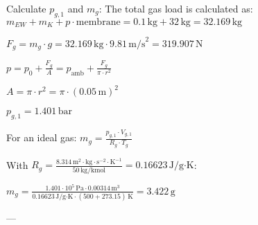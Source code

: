 Calculate \( p_{g,1} \) and \( m_g \):  
The total gas load is calculated as:  
\( m_{EW} + m_{K} + p \cdot \text{membrane} = 0.1 \, \text{kg} + 32 \, \text{kg} = 32.169 \, \text{kg} \)  

\( F_g = m_g \cdot g = 32.169 \, \text{kg} \cdot 9.81 \, \text{m/s}^2 = 319.907 \, \text{N} \)  

\( p = p_0 + \frac{F_g}{A} = p_{\text{amb}} + \frac{F_g}{\pi \cdot r^2} \)  

\( A = \pi \cdot r^2 = \pi \cdot (0.05 \, \text{m})^2 \)  

\( p_{g,1} = 1.401 \, \text{bar} \)  

For an ideal gas:  
\( m_g = \frac{p_{g,1} \cdot V_{g,1}}{R_g \cdot T_g} \)  

With \( R_g = \frac{8.314 \, \text{m}^2 \cdot \text{kg} \cdot \text{s}^{-2} \cdot \text{K}^{-1}}{50 \, \text{kg/kmol}} = 0.16623 \, \text{J/g·K} \):  

\( m_g = \frac{1.401 \cdot 10^5 \, \text{Pa} \cdot 0.00314 \, \text{m}^3}{0.16623 \, \text{J/g·K} \cdot (500 + 273.15) \, \text{K}} = 3.422 \, \text{g} \)  

---